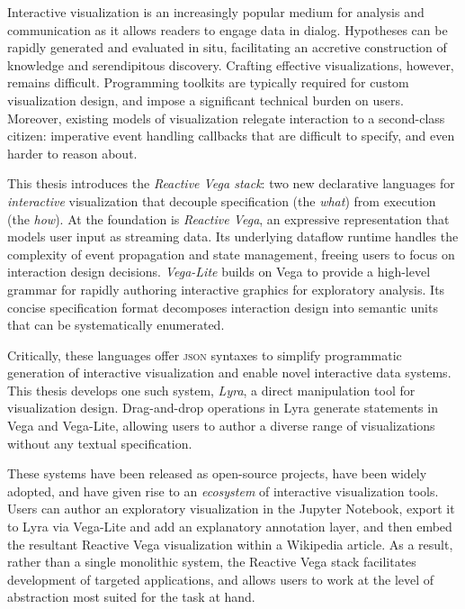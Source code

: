 

Interactive visualization is an increasingly popular medium for analysis and
communication as it allows readers to engage data in dialog. Hypotheses can be
rapidly generated and evaluated in situ, facilitating an accretive construction
of knowledge and serendipitous discovery. Crafting effective visualizations,
however, remains difficult. Programming toolkits are typically required for
custom visualization design, and impose a significant technical burden on users.
Moreover, existing models of visualization relegate interaction to a
second-class citizen: imperative event handling callbacks that are difficult to
specify, and even harder to reason about.

This thesis introduces the \emph{Reactive Vega stack}: two new declarative
languages for \emph{interactive} visualization that decouple specification (the
\emph{what}) from execution (the \emph{how}). At the foundation is
\emph{Reactive Vega}, an expressive representation that models user input as
streaming data. Its underlying dataflow runtime handles the complexity of event
propagation and state management, freeing users to focus on interaction design
decisions. \emph{Vega-Lite} builds on Vega to provide a high-level grammar for
rapidly authoring interactive graphics for exploratory analysis. Its concise
specification format decomposes interaction design into semantic units that can
be systematically enumerated.

Critically, these languages offer \textsc{json} syntaxes to simplify
programmatic generation of interactive visualization and enable novel
interactive data systems. This thesis develops one such system, \emph{Lyra}, a
direct manipulation tool for visualization design. Drag-and-drop operations in
Lyra generate statements in Vega and Vega-Lite, allowing users to author a
diverse range of visualizations without any textual specification.

These systems have been released as open-source projects, have been widely
adopted, and have given rise to an \emph{ecosystem} of interactive visualization
tools. Users can author an exploratory visualization in the Jupyter Notebook,
export it to Lyra via Vega-Lite and add an explanatory annotation layer, and
then embed the resultant Reactive Vega visualization within a Wikipedia article.
As a result, rather than a single monolithic system, the Reactive Vega stack
facilitates development of targeted applications, and allows users to work at
the level of abstraction most suited for the task at hand.